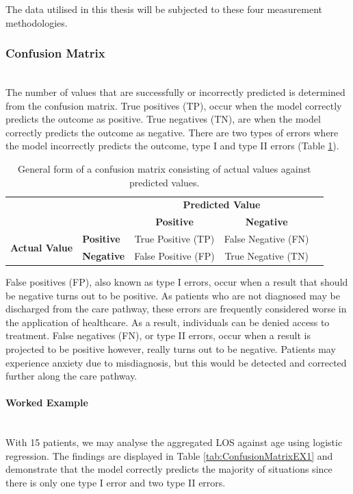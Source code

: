 \documentclass[../thesis.tex]{subfiles}
\begin{document}
The data utilised in this thesis will be subjected to these four measurement methodologies.

\subsubsection{Confusion Matrix}\\
The number of values that are successfully or incorrectly predicted is determined from the confusion matrix. True positives (TP), occur when the model correctly predicts the outcome as positive. True negatives (TN), are when the model correctly predicts the outcome as negative. There are two types of errors where the model incorrectly predicts the outcome, type I and type II errors (Table \ref{tab:ConfusionMatrix}).

\begin{table}[h!]
    \centering
    \begin{tabular}{clccc} \toprule
    && \multicolumn{2}{c}{\textbf{Predicted Value} }\\
         && \textbf{Positive} & \textbf{Negative}  \\ \midrule
      \multirow{2}{*}{\textbf{Actual Value}} &\textbf{Positive}   & True Positive (TP) & False Negative (FN)   \\
      &\textbf{Negative}  & False Positive (FP) & True Negative (TN)\\ \bottomrule
    \end{tabular}
\caption{General form of a confusion matrix consisting of actual values against predicted values.}
\label{tab:ConfusionMatrix}
\end{table}

False positives (FP), also known as type I errors, occur when a result that should be negative turns out to be positive. As patients who are not diagnosed may be discharged from the care pathway, these errors are frequently considered worse in the application of healthcare. As a result, individuals can be denied access to treatment. False negatives (FN), or type II  errors, occur when a result is projected to be positive however, really turns out to be negative. Patients may experience anxiety due to misdiagnosis, but this would be detected and corrected further along the care pathway.

\paragraph{Worked Example}\\
With 15 patients, we may analyse the aggregated LOS against age using logistic regression. The findings are displayed in Table \ref{tab:ConfusionMatrixEX1} and demonstrate that the model correctly predicts the majority of situations since there is only one type I error and two type II errors.
\end{document}
